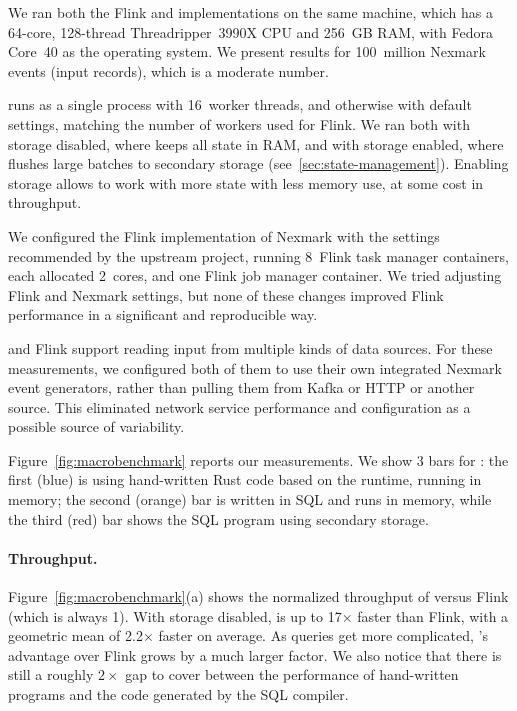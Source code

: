We ran both the Flink and \dbsp implementations on the same machine,
which has a 64-core, 128-thread Threadripper~3990X CPU and 256~GB RAM,
with Fedora Core~40 as the operating system. We present results for
100~million Nexmark events (input records), which is a moderate
number.

\dbsp runs as a single process with 16~worker threads, and otherwise
with default settings, matching the number of workers used for Flink.
We ran \dbsp both with storage disabled, where \dbsp keeps all state
in RAM, and with storage enabled, where \dbsp flushes large batches to
secondary storage (see~\ref{sec:state-management}).  Enabling storage
allows \dbsp to work with more state with less memory use, at some
cost in throughput.

We configured the Flink implementation of Nexmark with the settings
recommended by the upstream project, running 8~Flink task manager
containers, each allocated 2~cores, and one Flink job manager
container.  We tried adjusting Flink and Nexmark settings, but none of
these changes improved Flink performance in a significant and
reproducible way.

\dbsp and Flink support reading input from multiple kinds of data
sources.  For these measurements, we configured both of them to use
their own integrated Nexmark event generators, rather than pulling
them from Kafka or HTTP or another source.  This eliminated network
service performance and configuration as a possible source of
variability.

Figure~\ref{fig:macrobenchmark} reports our measurements.  We show 3
bars for \dbsp: the first (blue) is using hand-written Rust code based
on the \dbsp runtime, running in memory; the second (orange) bar is
written in SQL and runs in memory, while the third (red) bar shows the
SQL program using secondary storage.

\paragraph{Throughput.}

\newcommand{\x}{\(\times\)}

Figure~\ref{fig:macrobenchmark}(a) shows the normalized throughput of
\dbsp versus Flink (which is always 1).  With storage disabled, \dbsp
is up to 17\x{} faster than Flink, with a geometric mean of 2.2\x{}
faster on average.  As queries get more complicated, \dbsp's advantage
over Flink grows by a much larger factor.  We also notice that there
is still a roughly $2\times{}$ gap to cover between the performance of
hand-written \dbsp programs and the code generated by the SQL
compiler.

